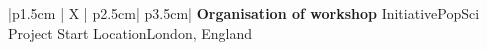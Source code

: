 %
\iftrue %
\begin{myTableEnv}{|p{1.5cm} | X | p{2.5cm}| p{3.5cm}|}
    \myRow
        {}
        {\bfseries Organisation of workshop}
        {Initiative}{PopSci Project}
    \myRow
        {Start}{}
        {Location}{London, England}
\end{myTableEnv}
%
\fi
%
